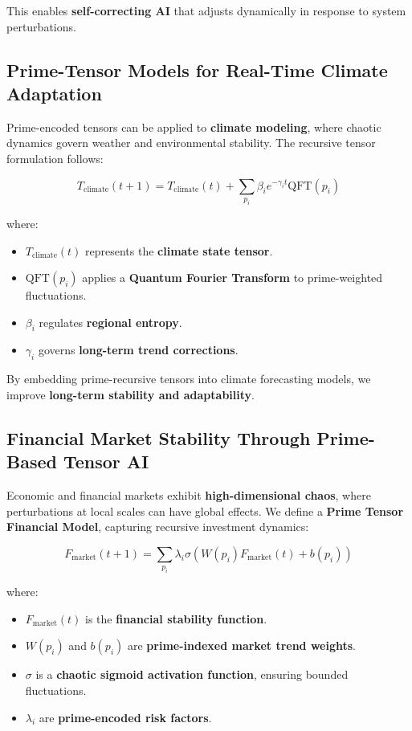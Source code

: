 \documentclass{article}
\theoremstyle{plain}
\theoremstyle{plain}
\theoremstyle{definition}
\theoremstyle{remark}
\begin{document}
This enables \textbf{self-correcting AI} that adjusts dynamically in response to system perturbations.

\subsection{Prime-Tensor Models for Real-Time Climate Adaptation}

Prime-encoded tensors can be applied to \textbf{climate modeling}, where chaotic dynamics govern weather and environmental stability. The recursive tensor formulation follows:

\begin{equation}
T_{\text{climate}}(t+1) = T_{\text{climate}}(t) + \sum_{p_i} \beta_i e^{-\gamma_i t} \text{QFT} (p_i)
\end{equation}

where:
\begin{itemize}
    \item $T_{\text{climate}}(t)$ represents the \textbf{climate state tensor}.
    \item $\text{QFT} (p_i)$ applies a \textbf{Quantum Fourier Transform} to prime-weighted fluctuations.
    \item $\beta_i$ regulates \textbf{regional entropy}.
    \item $\gamma_i$ governs \textbf{long-term trend corrections}.
\end{itemize}

By embedding prime-recursive tensors into climate forecasting models, we improve \textbf{long-term stability and adaptability}.

\subsection{Financial Market Stability Through Prime-Based Tensor AI}

Economic and financial markets exhibit \textbf{high-dimensional chaos}, where perturbations at local scales can have global effects. We define a \textbf{Prime Tensor Financial Model}, capturing recursive investment dynamics:

\begin{equation}
F_{\text{market}}(t+1) = \sum_{p_i} \lambda_i \sigma (W(p_i) F_{\text{market}}(t) + b(p_i))
\end{equation}

where:
\begin{itemize}
    \item $F_{\text{market}}(t)$ is the \textbf{financial stability function}.
    \item $W(p_i)$ and $b(p_i)$ are \textbf{prime-indexed market trend weights}.
    \item $\sigma$ is a \textbf{chaotic sigmoid activation function}, ensuring bounded fluctuations.
    \item $\lambda_i$ are \textbf{prime-encoded risk factors}.
\end{itemize}
\end{document}
